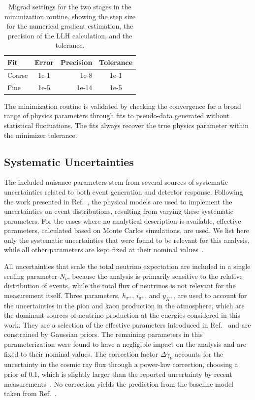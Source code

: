 \documentclass[
    aps,
    prd,
    reprint,
    amsmath,
    amssymb,
    nofootinbib,
    linenumbers,
    superscriptaddress,
    floatfix
]{revtex4-2}
\begin{document}
\begin{table}[h]
        \begin{tabular}{ lcrc }
        \hline\hline
        \textbf{Fit} & \textbf{Error} & \textbf{Precision} & \textbf{Tolerance} \\
        \hline\hline
        Coarse & 1e-1 & 1e-8 & 1e-1 \\
        Fine & 1e-5 & 1e-14 & 1e-5 \\
        \hline
        \end{tabular}
    \internallinenumbers
    \caption{Migrad settings for the two stages in the minimization routine, showing the step size for the numerical gradient estimation, the precision of the LLH calculation, and the tolerance.}
    \label{tab:minimization_settings}
\end{table}

The minimization routine is validated by checking the convergence for a broad range of physics parameters through fits to pseudo-data generated without statistical fluctuations.
The fits always recover the true physics parameter within the minimizer tolerance.


\subsection{\label{sec:uncertainties} Systematic Uncertainties}

The included nuisance parameters stem from several sources of systematic uncertainties related to both event generation and detector response. Following the work presented in Ref.~\cite{IceCubeCollaboration:2023wtb}, the physical models are used to implement the uncertainties on event distributions, resulting from varying these systematic parameters. For the cases where no analytical description is available, effective parameters, calculated based on Monte Carlos simulations, are used. We list here only the systematic uncertainties that were found to be relevant for this analysis, while all other parameters are kept fixed at their nominal values~\cite{Fischer_2023}.

All uncertainties that scale the total neutrino expectation are included in a single scaling parameter $N_{\nu}$, because the analysis is primarily sensitive to the relative distribution of events, while the total flux of neutrinos is not relevant for the measurement itself.
Three parameters, $h_{\pi^+}$, $i_{\pi^+}$, and $y_{K^+}$, are used to account for the uncertainties in the pion and kaon production in the atmosphere, which are the dominant sources of neutrino production at the energies considered in this work.
They are a selection of the effective parameters introduced in Ref.~\cite{Barr:2006it} and are constrained by Gaussian priors.
The remaining parameters in this parameterization were found to have a negligible impact on the analysis and are fixed to their nominal values.
The correction factor $\Delta \gamma_\nu$ accounts for the uncertainty in the cosmic ray flux through a power-law correction, choosing a prior of 0.1, which is slightly larger than the reported uncertainty by recent measurements~\cite{PhysRevD.95.023012}.
No correction yields the prediction from the baseline model taken from Ref.~\cite{PhysRevD.92.023004_Honda_Flux}.
\end{document}
